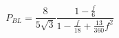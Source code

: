\begin{equation}\label{bl1}
P_{BL}=\frac{8}{5\sqrt{3}}\frac{1-\frac{f}{6}}{1-\frac{f}{18}+\frac{13}{360}f^2}
\end{equation}

